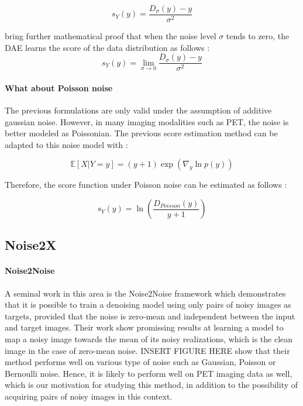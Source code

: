 \begin{equation}
    s_Y(y) = \frac{D_{\sigma}(y) - y}{\sigma^2}
\end{equation}

 bring further mathematical proof that when the noise level $\sigma$ tends to zero, the DAE learns the score of the data distribution as follows :
\begin{equation}
    s_Y(y) = \lim_{\sigma \to 0} \frac{D_{\sigma}(y) - y}{\sigma^2}
\end{equation}

\paragraph{What about Poisson noise}

The previous formulations are only valid under the assumption of additive gaussian noise. However, in many imaging modalities such as PET, the noise is better modeled as Poissonian. The previous score estimation method can be adapted to this noise model with :

\begin{equation}
    \mathbb{E}\left[X | Y = y\right] = \left(y + 1\right)\exp \left( \nabla_y \ln p(y)\right)
\end{equation}
 
Therefore, the score function under Poisson noise can be estimated as follows :

\begin{equation}
    s_Y(y) = \ln \left( \frac{D_{Poisson}(y)}{y + 1} \right)
\end{equation}

\subsection{Noise2X}

\paragraph{Noise2Noise}

A seminal work in this area is the Noise2Noise framework \cite{lehtinen_noise2noise_2018} which demonstrates that it is possible to train a denoising model using only pairs of noisy images as targets, provided that the noise is zero-mean and independent between the input and target images.
Their work show promissing results at learning a model to map a noisy image towards the mean of its noisy realizations, which is the clean image in the case of zero-mean noise.
INSERT FIGURE HERE
 show that their method performs well on various type of noise such as Gaussian, Poisson or Bernoulli noise.
Hence, it is likely to perform well on PET imaging data as well, which is our motivation for studying this method, in addition to the possibility of acquiring pairs of noisy images in this context.

